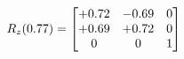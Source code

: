 \documentclass[preview]{standalone}
\begin{document}
\begin{align*}
\special{dvisvgm:raw <g id='unique000'>}R_{z}(0.77) = \begin{bmatrix}+0.72 & -0.69 & 0 \\+0.69 & +0.72 & 0 \\0 & 0 & 1\end{bmatrix}\special{dvisvgm:raw </g>}
\end{align*}
\end{document}
